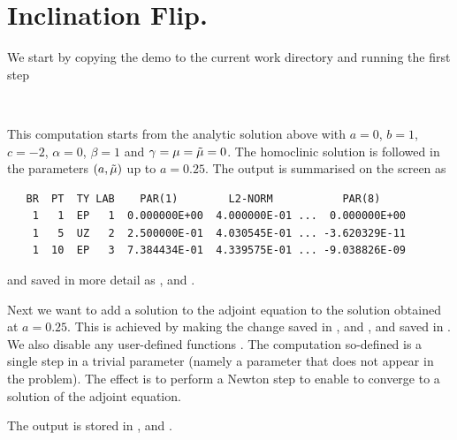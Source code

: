\documentclass[12pt]{report}
\begin{document}
\section{Inclination Flip.}
We start by copying the demo to the current work directory 
and running the first step
\begin{center}
\\
\end{center}
This computation starts from the analytic solution above with 
$a=0$, $b=1$, $c=-2$, $\alpha=0$, $\beta=1$ and 
$\gamma = \mu=\tilde \mu =0$. The homoclinic solution is followed in the
parameters $(a,\tilde \mu)$  up to $a=0.25$. 
The output is summarised on the screen as
\begin{verbatim}
   BR  PT  TY LAB    PAR(1)        L2-NORM           PAR(8)     
    1   1  EP   1  0.000000E+00  4.000000E-01 ...  0.000000E+00
    1   5  UZ   2  2.500000E-01  4.030545E-01 ... -3.620329E-11
    1  10  EP   3  7.384434E-01  4.339575E-01 ... -9.038826E-09
\end{verbatim}
and saved in more detail as ,  and .

Next we want to add a solution to the adjoint equation to the
solution obtained at $a=0.25$. This is
achieved by making the change  saved in ,
and ,   and  saved in 
. We also disable any
user-defined functions . The computation so-defined 
is a single step in a trivial parameter  (namely a parameter
that does not appear in the problem). The effect is to perform a Newton
step to enable \AUTO to converge to a solution of the adjoint equation.
\begin{center}
\end{center} 
The output is stored in ,   and .
\end{document}
